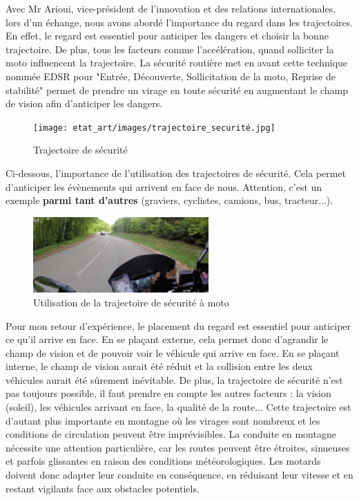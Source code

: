 Avec Mr Arioui, vice-président de l'innovation et des relations internationales, lors d'un échange, nous avons abordé l'importance du regard dans les trajectoires. En effet, le regard est essentiel pour anticiper les dangers et choisir la bonne trajectoire. De plus, tous les facteurs comme l'accélération, quand solliciter la moto influencent la trajectoire. 
La sécurité routière\cite{trajectoire_securite} met en avant cette technique nommée EDSR pour "Entrée, Découverte, Sollicitation de la moto, Reprise de stabilité" permet de prendre un virage en toute sécurité en augmentant le champ de vision afin d'anticiper les dangers. 
\begin{figure}[H]
    \centering
    \texttt{[image: etat\_art/images/trajectoire\_securité.jpg]} 
    \caption{Trajectoire de sécurité}
\end{figure}
Ci-dessous, l'importance de l'utilisation des trajectoires de sécurité. Cela permet d'anticiper les évènements qui arrivent en face de nous. Attention, c'est un exemple \textbf{parmi tant d'autres} (graviers, cyclistes, camions, bus, tracteur...).
\begin{figure}[H]
    \centering
    \includegraphics[width=0.6\textwidth]{etat_art/images/morvan.png} 
    \caption{Utilisation de la trajectoire de sécurité à moto}
\end{figure}
Pour mon retour d'expérience, le placement du regard est essentiel pour anticiper ce qu'il arrive en face. En se plaçant externe, cela permet donc d'agrandir le champ de vision et de pouvoir voir le véhicule qui arrive en face. En se plaçant interne, le champ de vision aurait été réduit et la collision entre les deux véhicules aurait été sûrement inévitable. De plus, la trajectoire de sécurité n'est pas toujours possible, il faut prendre en compte les autres facteurs : la vision (soleil), les véhicules arrivant en face, la qualité de la route...
Cette trajectoire est d'autant plus importante en montagne où les virages sont nombreux et les conditions de circulation peuvent être imprévisibles. La conduite en montagne nécessite une attention particulière, car les routes peuvent être étroites, sinueuses et parfois glissantes en raison des conditions météorologiques. Les motards doivent donc adapter leur conduite en conséquence, en réduisant leur vitesse et en restant vigilants face aux obstacles potentiels.
